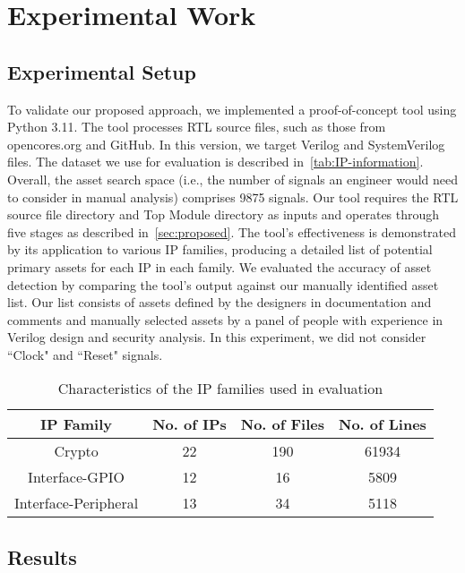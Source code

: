 \section{Experimental Work\label{sec:experiments}}

\subsection{Experimental Setup}

To validate our proposed approach, we implemented a proof-of-concept tool using Python 3.11. 
The tool processes RTL source files, such as those from opencores.org and GitHub. 
In this version, we target Verilog and SystemVerilog files. 
The dataset we use for evaluation is described in~\autoref{tab:IP-information}.
Overall, the asset search space (i.e., the number of signals an engineer would need to consider in manual analysis) comprises 9875 signals. 
Our tool requires the RTL source file directory and Top Module directory as inputs and operates through five stages as described in~\autoref{sec:proposed}. 
The tool's effectiveness is demonstrated by its application to various IP families, producing a detailed list of potential primary assets for each IP in each family. 
We evaluated the accuracy of asset detection by comparing the tool's output against our manually identified asset list. Our list consists of assets defined by the designers in documentation and comments and manually selected assets by a panel of people with experience in Verilog design and security analysis.
In this experiment, we did not consider ``Clock" and ``Reset" signals.

\begin{table}[t!]
\centering
\caption{Characteristics of the IP families used in evaluation}
\label{tab:IP-information}
\begin{tabular}{@{}cccc@{}}
\toprule
IP Family            & No. of IPs & No. of Files & No. of Lines \\ \midrule
Crypto               & 22            & 190          & 61934        \\
Interface-GPIO       & 12            & 16           & 5809         \\
Interface-Peripheral & 13            & 34           & 5118         \\ \bottomrule
\end{tabular}
\end{table}



\subsection{Results}

